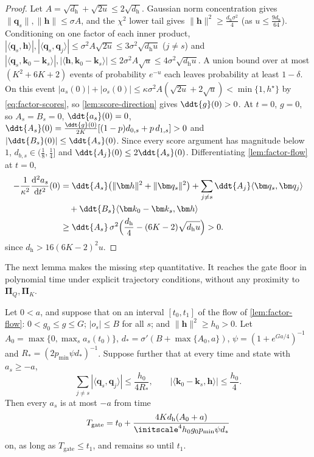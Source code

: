 \begin{proof}
Let $A=\sqrt{d_{\mathrm h}}+\sqrt{2u}\le2\sqrt{d_{\mathrm h}}$. Gaussian norm concentration gives $\|\bm q_s\|,\|\bm h\|\le\sigma A$, and the $\chi^2$ lower
tail gives $\|\bm h\|^2\ge\frac{d_{\mathrm h}\sigma^2}4$ (as $u\le\frac{9d_{\mathrm h}}{64}$). Conditioning on one factor of each inner product,
$|\langle\bm q_s,\bm h\rangle|,|\langle\bm q_s,\bm q_j\rangle|\le\sigma^2A\sqrt{2u}\le3\sigma^2\sqrt{d_{\mathrm h}u}$ ($j\ne s$) and
$|\langle\bm q_s,\bm k_0-\bm k_s\rangle|,|\langle\bm h,\bm k_0-\bm k_s\rangle|\le2\sigma^2A\sqrt u\le4\sigma^2\sqrt{d_{\mathrm h}u}$. A union bound
over at most $(K^2+6K+2)$ events of probability $e^{-u}$ each leaves probability at least $1-\delta$. On this event
$|a_s(0)|+|o_s(0)|\le\kappa\sigma^2A(\sqrt{2u}+2\sqrt u)<\min\{1,h^\star\}$ by \cref{eq:factor-scores}, so \cref{lem:score-direction} gives $\ddt{g}(0)>0$. At $t=0$, $g=0$, so $A_s=B_s=0$,
$\ddt{a_s}(0)=0$, $\ddt{A_s}(0)=\frac{\ddt{g}(0)}{2K}[(1-p)d_{0,s}+p\,d_{1,s}]>0$ and $|\ddt{B_s}(0)|\le\ddt{A_s}(0)$. Since every score argument
has magnitude below $1$, $d_{b,s}\in(\frac18,\frac14]$ and $\ddt{A_j}(0)\le2\ddt{A_s}(0)$. Differentiating \cref{lem:factor-flow} at $t=0$,
\[
 \begin{aligned}
 -\frac{1}{\kappa^2}\frac{\mathrm d^2a_s}{\mathrm dt^2}(0)
 &=\ddt{A_s}\bigl(\|\bm h\|^2+\|\bm q_s\|^2\bigr)
 +\sum_{j\ne s}\ddt{A_j}\langle\bm q_s,\bm q_j\rangle\\
 &\quad+\ddt{B_s}\langle\bm k_0-\bm k_s,\bm h\rangle\\
 &\ge\ddt{A_s}\,\sigma^2\Bigl(\frac{d_{\mathrm h}}4-(6K-2)\sqrt{d_{\mathrm h}u}\Bigr)>0.
 \end{aligned}
\]
since $d_{\mathrm h}>16(6K-2)^2u$.
\end{proof}

The next lemma makes the missing step quantitative. It reaches the gate floor in polynomial time under explicit trajectory conditions,
without any proximity to $\bm\Pi_Q,\bm\Pi_K$.

\begin{lemma}
\label{lem:gate-hitting}
Let $0<a$, and suppose that on an interval $[t_0,t_1]$ of the flow of \cref{lem:factor-flow}: $0<g_0\le g\le G$; $|o_s|\le B$ for all $s$;
and $\|\bm h\|^2\ge h_0>0$. Let $A_0=\max\{0,\max_sa_s(t_0)\}$, $d_\ast=\sigma'(B+\max\{A_0,a\})$, $\psi=(1+e^{Ga/4})^{-1}$ and
$R_\ast=(2p_{\min}\psi d_\ast)^{-1}$. Suppose further that at every time and state with $a_s\ge-a$,
\[
 \sum_{j\ne s}|\langle\bm q_s,\bm q_j\rangle|\le\frac{h_0}{4R_\ast},\qquad |\langle\bm k_0-\bm k_s,\bm h\rangle|\le\frac{h_0}4 .
\]
Then every $a_s$ is at most $-a$ from time
\[
 T_{\mathrm{gate}}=t_0+\frac{4Kd_{\mathrm h}(A_0+a)}{\initscale^4h_0g_0p_{\min}\psi d_\ast}
\]
on, as long as $T_{\mathrm{gate}}\le t_1$, and remains so until $t_1$.
\end{lemma}

